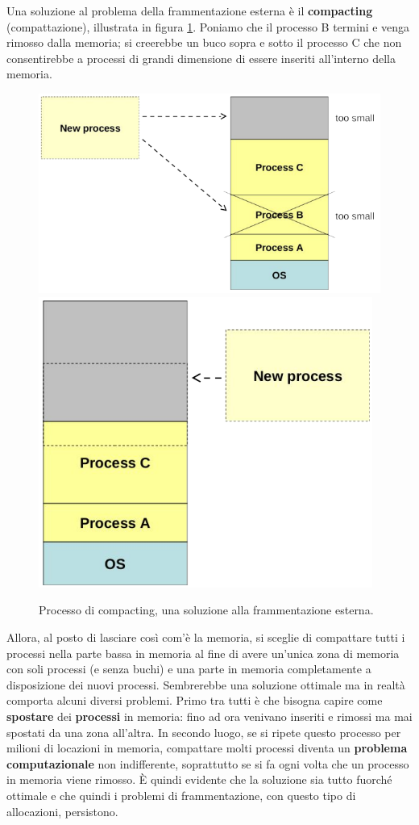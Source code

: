 Una soluzione al problema della frammentazione esterna è il \textbf{compacting} (compattazione), illustrata in figura \ref{fig:compacting}. Poniamo che il processo B termini e venga rimosso dalla memoria; si creerebbe un buco sopra e sotto il processo C che non consentirebbe a processi di grandi dimensione di essere inseriti all'interno della memoria.
\begin{figure}[h]
    \centering
    \includegraphics[width = .48\textwidth]{../res/imgs/main memory/compacting1.png}
    \hspace{2em}
    \includegraphics[width = .32\textwidth]{../res/imgs/main memory/compacting2.png}
    \caption{Processo di compacting, una soluzione alla frammentazione esterna.}
    \label{fig:compacting}
\end{figure}
Allora, al posto di lasciare così com'è la memoria, si sceglie di compattare tutti i processi nella parte bassa in memoria al fine di avere un'unica zona di memoria con soli processi (e senza buchi) e una parte in memoria completamente a disposizione dei nuovi processi. Sembrerebbe una soluzione ottimale ma in realtà comporta alcuni diversi problemi. Primo tra tutti è che bisogna capire come \textbf{spostare} dei \textbf{processi} in memoria: fino ad ora venivano inseriti e rimossi ma mai spostati da una zona all'altra. In secondo luogo, se si ripete questo processo per milioni di locazioni in memoria, compattare molti processi diventa un \textbf{problema computazionale} non indifferente, soprattutto se si fa ogni volta che un processo in memoria viene rimosso. È quindi evidente che la soluzione sia tutto fuorché ottimale e che quindi i problemi di frammentazione, con questo tipo di allocazioni, persistono.

% 
